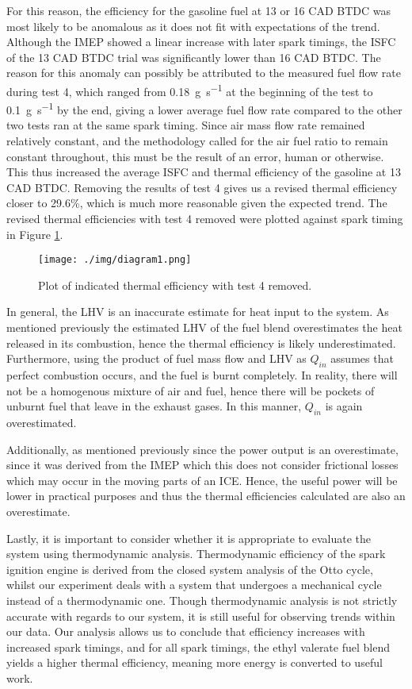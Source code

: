 For this reason, the efficiency for the gasoline fuel at 13 or 16 CAD BTDC was most likely to be anomalous as it does not fit with expectations of the trend. Although the IMEP showed a linear increase with later spark timings, the ISFC of the 13 CAD BTDC trial was significantly lower than 16 CAD BTDC. The reason for this anomaly can possibly be attributed to the measured fuel flow rate during test 4, which ranged from \SI{0.18}{\gram\per\second} at the beginning of the test to \SI{0.1}{\gram\per\second} by the end, giving a lower average fuel flow rate compared to the other two tests ran at the same spark timing. Since air mass flow rate remained relatively constant, and the methodology called for the air fuel ratio to remain constant throughout, this must be the result of an error, human or otherwise. This thus increased the average ISFC and thermal efficiency of the gasoline at 13 CAD BTDC. Removing the results of test 4 gives us a revised thermal efficiency closer to 29.6\%, which is much more reasonable given the expected trend. The revised thermal efficiencies with test 4 removed were plotted against spark timing in Figure \ref{q3-f2}.
\begin{figure}[H]
    \centering
    \texttt{[image: ./img/diagram1.png]}
    \caption{Plot of indicated thermal efficiency with test 4 removed.}
    \label{q3-f2}
\end{figure}
In general, the LHV is an inaccurate estimate for heat input to the system. As mentioned previously the estimated LHV of the fuel blend overestimates the heat released in its combustion, hence the thermal efficiency is likely underestimated. Furthermore, using the product of fuel mass flow and LHV as $Q_{in}$ assumes that perfect combustion occurs, and the fuel is burnt completely. In reality, there will not be a homogenous mixture of air and fuel, hence there will be pockets of unburnt fuel that leave in the exhaust gases. In this manner, $Q_{in}$ is again overestimated.

Additionally, as mentioned previously since the power output is an overestimate, since it was derived from the IMEP which this does not consider frictional losses which may occur in the moving parts of an ICE. Hence, the useful power will be lower in practical purposes and thus the thermal efficiencies calculated are also an overestimate.

Lastly, it is important to consider whether it is appropriate to evaluate the system using thermodynamic analysis. Thermodynamic efficiency of the spark ignition engine is derived from the closed system analysis of the Otto cycle, whilst our experiment deals with a system that undergoes a mechanical cycle instead of a thermodynamic one. Though thermodynamic analysis is not strictly accurate with regards to our system, it is still useful for observing trends within our data. Our analysis allows us to conclude that efficiency increases with increased spark timings, and for all spark timings, the ethyl valerate fuel blend yields a higher thermal efficiency, meaning more energy is converted to useful work.
